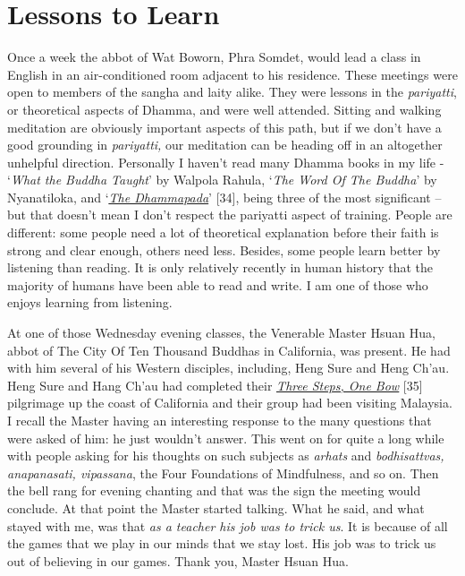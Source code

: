 \chapter{Lessons to Learn}

Once a week the abbot of Wat Boworn, Phra Somdet, would lead a class in
English in an air-conditioned room adjacent to his residence. These
meetings were open to members of the sangha and laity alike. They were
lessons in the \emph{pariyatti}, or theoretical aspects of Dhamma, and
were well attended. Sitting and walking meditation are obviously
important aspects of this path, but if we don't have a good grounding in
\emph{pariyatti,} our meditation can be heading off in an altogether
unhelpful direction. Personally I haven't read many Dhamma books in my
life - `\emph{What the Buddha Taught}' by Walpola Rahula, `\emph{The
Word Of The Buddha}' by Nyanatiloka, and
`\href{https://forestsangha.org/teachings/books/a-dhammapada-for-contemplation?language=English}{\emph{\underline{The
Dhammapada}}}' {[}34{]}, being three of the most significant -- but that
doesn't mean I don't respect the pariyatti aspect of training. People
are different: some people need a lot of theoretical explanation before
their faith is strong and clear enough, others need less. Besides, some
people learn better by listening than reading. It is only relatively
recently in human history that the majority of humans have been able to
read and write. I am one of those who enjoys learning from listening.

At one of those Wednesday evening classes, the Venerable Master Hsuan
Hua, abbot of The City Of Ten Thousand Buddhas in California, was
present. He had with him several of his Western disciples, including,
Heng Sure and Heng Ch'au. Heng Sure and Hang Ch'au had completed their
\href{https://www.amazon.co.uk/dp/B07TWKMRFB/ref=dp-kindle-redirect?_encoding=UTF8\&btkr=1}{\emph{\underline{Three
Steps, One Bow}}} {[}35{]} pilgrimage up the coast of California and
their group had been visiting Malaysia. I recall the Master having an
interesting response to the many questions that were asked of him: he
just wouldn't answer. This went on for quite a long while with people
asking for his thoughts on such subjects as \emph{arhats} and
\emph{bodhisattvas,} \emph{anapanasati, vipassana}, the Four Foundations
of Mindfulness, and so on. Then the bell rang for evening chanting and
that was the sign the meeting would conclude. At that point the Master
started talking. What he said, and what stayed with me, was that
\emph{as a teacher his job was to trick us}. It is because of all the
games that we play in our minds that we stay lost. His job was to trick
us out of believing in our games. Thank you, Master Hsuan Hua.

